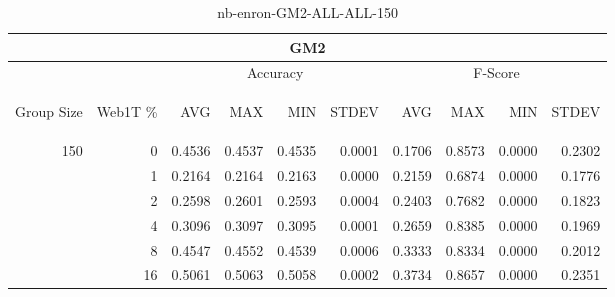 \begin{center}
\begin{table}[htbp]
\begin{tabular}{ | r | r | r | r | r | r | r | r | r | r |}
\hline
\multicolumn{10}{|c|}{GM2}\\
\hline
 & & \multicolumn{4}{|c|}{Accuracy} & \multicolumn{4}{|c|}{F-Score}\\ \cline{3-10}
\begin{sideways}Group Size\end{sideways} & \begin{sideways}Web1T \%\end{sideways} & \begin{sideways}AVG\end{sideways} & \begin{sideways}MAX\end{sideways} & \begin{sideways}MIN\end{sideways} & \begin{sideways}STDEV\end{sideways} & \begin{sideways}AVG\end{sideways} & \begin{sideways}MAX\end{sideways} & \begin{sideways}MIN\end{sideways} & \begin{sideways}STDEV\end{sideways}\\
\hline
\multirow{5}{*}{150}
 & 0 & 0.4536 & 0.4537 & 0.4535 & 0.0001 & 0.1706 & 0.8573 & 0.0000 & 0.2302\\ \cline{2-10}
 & 1 & 0.2164 & 0.2164 & 0.2163 & 0.0000 & 0.2159 & 0.6874 & 0.0000 & 0.1776\\ \cline{2-10}
 & 2 & 0.2598 & 0.2601 & 0.2593 & 0.0004 & 0.2403 & 0.7682 & 0.0000 & 0.1823\\ \cline{2-10}
 & 4 & 0.3096 & 0.3097 & 0.3095 & 0.0001 & 0.2659 & 0.8385 & 0.0000 & 0.1969\\ \cline{2-10}
 & 8 & 0.4547 & 0.4552 & 0.4539 & 0.0006 & 0.3333 & 0.8334 & 0.0000 & 0.2012\\ \cline{2-10}
 & 16 & 0.5061 & 0.5063 & 0.5058 & 0.0002 & 0.3734 & 0.8657 & 0.0000 & 0.2351\\ \cline{2-10}
\hline
\end{tabular}
\caption{nb-enron-GM2-ALL-ALL-150}
\label{table:nb-enron-GM2-ALL-ALL-150}
\end{table}
\end{center}

